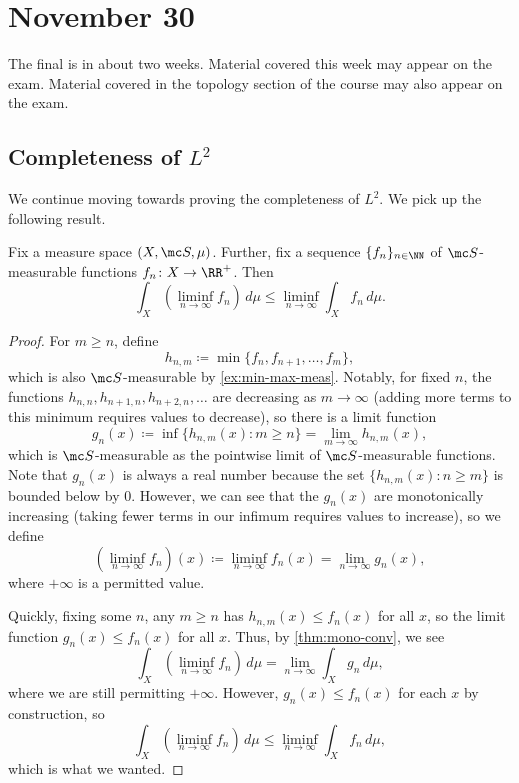 \documentclass[../notes.tex]{subfiles}
\begin{document}
\section{November 30}

The final is in about two weeks. Material covered this week may appear on the exam. Material covered in the topology section of the course may also appear on the exam.

\subsection{Completeness of \texorpdfstring{$L^2$}{ L2}}
We continue moving towards proving the completeness of $L^2$. We pick up the following result.
\begin{lemma}[Fatou] \label{lem:fatou}
	Fix a measure space $(X,\mc S,\mu)$. Further, fix a sequence $\{f_n\}_{n\in\NN}$ of $\mc S$-measurable functions $f_n\colon X\to\RR^+$. Then
	\[\int_X\left(\liminf_{n\to\infty} f_n\right)\,d\mu\le\liminf_{n\to\infty}\int_Xf_n\,d\mu.\]
\end{lemma}
\begin{proof}
	For $m\ge n$, define
	\[h_{n,m}\coloneqq\min\{f_n,f_{n+1},\ldots,f_m\},\]
	which is also $\mc S$-measurable by \autoref{ex:min-max-meas}. Notably, for fixed $n$, the functions $h_{n,n},h_{n+1,n},h_{n+2,n},\ldots$ are decreasing as $m\to\infty$ (adding more terms to this minimum requires values to decrease), so there is a limit function
	\[g_n(x)\coloneqq\inf\{h_{n,m}(x):m\ge n\}=\lim_{m\to\infty}h_{n,m}(x),\]
	which is $\mc S$-measurable as the pointwise limit of $\mc S$-measurable functions. Note that $g_n(x)$ is always a real number because the set $\{h_{n,m}(x):n\ge m\}$ is bounded below by $0$. However, we can see that the $g_n(x)$ are monotonically increasing (taking fewer terms in our infimum requires values to increase), so we define
	\[\left(\liminf_{n\to\infty}f_n\right)(x)\coloneqq\liminf_{n\to\infty}f_n(x)=\lim_{n\to\infty}g_n(x),\]
	where $+\infty$ is a permitted value.
	
	Quickly, fixing some $n$, any $m\ge n$ has $h_{n,m}(x)\le f_n(x)$ for all $x$, so the limit function $g_n(x)\le f_n(x)$ for all $x$. Thus, by \autoref{thm:mono-conv}, we see
	\[\int_X\left(\liminf_{n\to\infty} f_n\right)\,d\mu=\lim_{n\to\infty}\int_Xg_n\,d\mu,\]
	where we are still permitting $+\infty$. However, $g_n(x)\le f_n(x)$ for each $x$ by construction, so
	\[\int_X(\liminf_{n\to\infty} f_n)\,d\mu\le\liminf_{n\to\infty}\int_Xf_n\,d\mu,\]
	which is what we wanted.
\end{proof}
\end{document}
